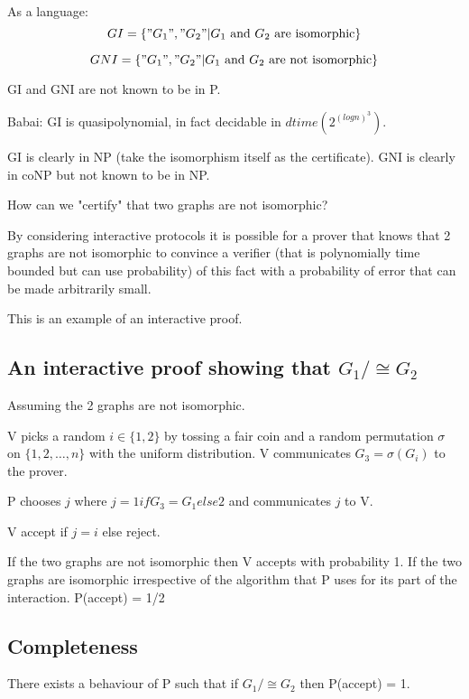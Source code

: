 \documentclass[a4paper,12pt]{article}
\theoremstyle{definition}
\theoremstyle{remark}
\begin{document}
As a language:
\begin{equation*}
    GI = \{"G_1", "G_2" | G_1 \text{ and } G_2 \text{ are isomorphic}\}
\end{equation*}

\begin{equation*}
    GNI = \{"G_1", "G_2" | G_1 \text{ and } G_2 \text{ are not isomorphic}\}
\end{equation*}

GI and GNI are not known to be in P.

Babai: GI is quasipolynomial, in fact decidable in $dtime(2^{(log n)^3})$.

GI is clearly in NP (take the isomorphism itself as the certificate).
GNI is clearly in coNP but not known to be in NP.

How can we "certify" that two graphs are not isomorphic?

By considering interactive protocols it is possible for a prover that knows that 2 graphs are not isomorphic to convince a verifier
(that is polynomially time bounded but can use probability) of this fact with a probability of error that can be made arbitrarily small.

This is an example of an interactive proof.

\subsection*{An interactive proof showing that $G_1 /\cong G_2$}
Assuming the 2 graphs are not isomorphic.

V picks a random $i \in \{1, 2\}$ by tossing a fair coin and a random permutation $\sigma$ on $\{1, 2, \dots, n\}$ with the uniform distribution.
V communicates $G_3 = \sigma (G_i)$ to the prover.

P chooses $j$ where $j = 1 if G_3 = G_1 else 2$ and communicates $j$ to V.

V accept if $j = i$ else reject.

If the two graphs are not isomorphic then V accepts with probability 1.
If the two graphs are isomorphic
irrespective of the algorithm that P uses for its part of the interaction.
P(accept) = 1/2

\subsection*{Completeness}
There exists a behaviour of P such that if $G_1 /\cong G_2$ then P(accept) = 1.
\end{document}
